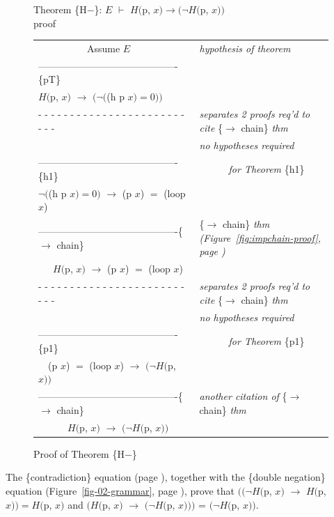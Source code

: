 \begin{figure}
Theorem \{H$-$\}: $E$ $\vdash$ $H($p, $x) \rightarrow(\neg H($p, $x))$~\\
proof
\begin{center}
\begin{tabular}{ll}
~~~~~~~~~~Assume $E$                                &\emph{hypothesis of theorem}\\
-------------------------------------------\{pT\}   &\\
$H($p, $x)$ $\rightarrow$ $(\neg($(h p $x) = 0))$   &\\
 - - - - - - - - - - - - - - - - - - - - - - - - - -&\emph{separates 2 proofs req'd to cite} \{$\rightarrow$ chain\} \emph{thm}\\
                                                    &\emph{no hypotheses required}\\
-------------------------------------------\{h1\}   &~~~~~~\emph{for Theorem} \{h1\}\\
$\neg($(h p $x)=0)$ $\rightarrow$ (p $x$) $=$ (loop $x$)&\\
-------------------------------------------\{$\rightarrow$ chain\} &\{$\rightarrow$ chain\} \emph{thm (Figure~\ref{fig:impchain-proof}, page \pageref{fig:impchain-proof})}\\
~~~$H($p, $x)$ $\rightarrow$ (p $x$) $=$ (loop $x$) &\\
 - - - - - - - - - - - - - - - - - - - - - - - - - -&\emph{separates 2 proofs req'd to cite} \{$\rightarrow$ chain\} \emph{thm}\\
                                                    &\emph{no hypotheses required}\\
-------------------------------------------\{p1\}   &~~~~~~\emph{for Theorem} \{p1\}\\
~~(p $x$) $=$ (loop $x$) $\rightarrow$ $(\neg H($p, $x))$ &\\
-------------------------------------------\{$\rightarrow$ chain\} &\emph{another citation of} \{$\rightarrow$ chain\} \emph{thm}\\
~~~~~~$H($p, $x)$ $\rightarrow$ $(\neg H($p, $x))$  &\\
\end{tabular}

\end{center}
\caption{Proof of Theorem \{H$-$\}}
\label{fig:hminus-thm-proof}
\end{figure}

The \{contradiction\} equation (page \pageref{boolean-contradiction}),
together with the \{double negation\} equation
(Figure~\ref{fig-02-grammar}, page \pageref{fig-02-grammar}),
prove that
$((\neg H($p, $x)$ $\rightarrow$ $H($p, $x)) = H($p, $x)$
and
$(H($p, $x)$ $\rightarrow$ $(\neg H($p, $x)))$ = $(\neg H($p, $x))$.


